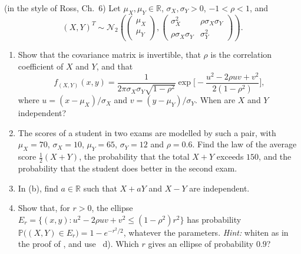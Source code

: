 \begin{exercise}\label{ex:gv-bivariate}
\medium (in the style of Ross, Ch.~6) Let $\mu_X,\mu_Y\in\mathbb R$, $\sigma_X,\sigma_Y>0$,
$-1<\rho<1$, and
\[
  (X,Y)^T\sim\mathcal N_2\left(\begin{pmatrix}\mu_X\\\mu_Y\end{pmatrix},
  \begin{pmatrix}\sigma_X^2&\rho\sigma_X\sigma_Y\\\rho\sigma_X\sigma_Y&\sigma_Y^2\end{pmatrix}\right).
\]
\begin{enumerate}[label=(\alph*)]
  \item Show that the covariance matrix is invertible, that $\rho$ is the correlation coefficient
    of $X$ and $Y$, and that
    \[
      f_{(X,Y)}(x,y)=\frac1{2\pi\sigma_X\sigma_Y\sqrt{1-\rho^2}}
      \exp\Big[-\frac{u^2-2\rho uv+v^2}{2(1-\rho^2)}\Big],
    \]
    where $u=(x-\mu_X)/\sigma_X$ and $v=(y-\mu_Y)/\sigma_Y$.
    When are $X$ and $Y$ independent?
  \item The scores of a student in two exams are modelled by such a pair, with $\mu_X=70$,
    $\sigma_X=10$, $\mu_Y=65$, $\sigma_Y=12$ and $\rho=0.6$. Find the law of the average score
    $\frac12(X+Y)$, the probability that the total $X+Y$ exceeds $150$, and the probability that the
    student does better in the second exam.
  \item In (b), find $a\in\mathbb R$ such that $X+aY$ and $X-Y$ are independent.
  \item Show that, for $r>0$, the ellipse
    $E_r=\{(x,y):u^2-2\rho uv+v^2\le(1-\rho^2)r^2\}$ has probability
    $\mathbb P\big((X,Y)\in E_r\big)=1-e^{-r^2/2}$, whatever the parameters. \emph{Hint:} whiten as
    in the proof of , and use ~d). Which $r$
    gives an ellipse of probability $0.9$?
\end{enumerate}
\end{exercise}


